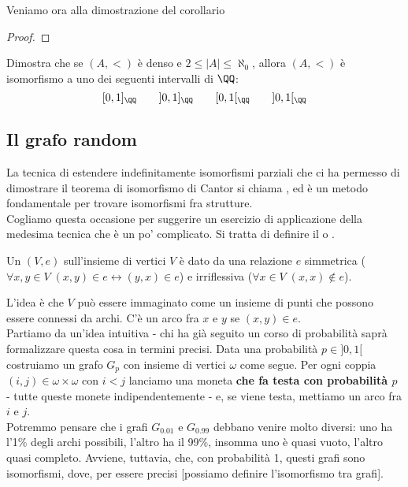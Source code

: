 \documentclass[11pt]{scrartcl}
\begin{document}
Veniamo ora alla dimostrazione del corollario

\begin{proof}
	
\end{proof}

\begin{exercise}
	Dimostra che se $(A,<)$ è denso e $2 \leq |A| \leq \aleph_0$, allora $(A,<)$ è isomorfismo a uno dei seguenti intervalli di $\QQ$:
	\[ [0,1]_{\QQ} \qquad ]0,1]_{\QQ} \qquad [0,1[_{\QQ} \qquad ]0,1[_{\QQ}
		\]
\end{exercise}

\subsection{Il grafo random}

La tecnica di estendere indefinitamente isomorfismi parziali che ci ha permesso di dimostrare il teorema di isomorfismo di Cantor
si chiama , ed è un metodo fondamentale per trovare isomorfismi fra strutture.\\
Cogliamo questa occasione per suggerire un esercizio di applicazione della medesima tecnica che è un po' complicato. Si tratta di definire il 
o .

\begin{definition}[Grafo]
	Un  $(V,e)$ sull'insieme di vertici $V$ è dato da una relazione $e$ simmetrica ($\forall x,y \in V \; (x,y) \in e \leftrightarrow (y,x) \in e$) e 
	irriflessiva ($\forall x \in V \; (x,x) \not\in e$).
\end{definition}

L'idea è che $V$ può essere immaginato come un insieme di punti che possono essere connessi da archi. C'è un arco fra $x$ e $y$ se $(x,y) \in e$.\\
%
Partiamo da un'idea intuitiva -  chi ha già seguito un corso di probabilità saprà formalizzare questa cosa in termini precisi. Data una probabilità $p \in ]0,1[$ costruiamo un grafo
$G_p$ con insieme di vertici $\omega$ come segue. Per ogni coppia $(i,j) \in \omega \times \omega$ con $i < j$ lanciamo una moneta \textbf{che fa testa con probabilità $p$} - tutte queste monete indipendentemente - e, se viene testa, mettiamo un arco 
fra $i$ e $j$.\\
Potremmo pensare che i grafi $G_{0.01}$ e $G_{0.99}$ debbano venire molto diversi: uno ha l'1\% degli archi possibili, l'altro ha il 99\%, insomma uno è quasi vuoto, l'altro quasi completo. Avviene, tuttavia, che, con probabilità 1, questi grafi sono isomorfismi, dove, per essere precisi
[possiamo definire l'isomorfismo tra grafi].
\end{document}
